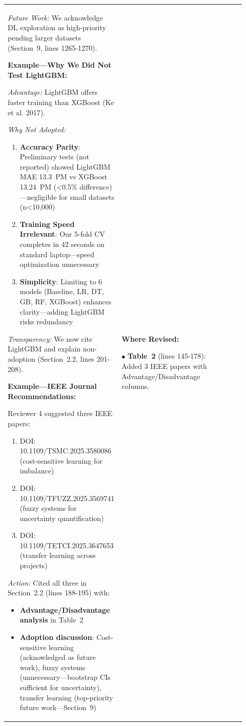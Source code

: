 \documentclass[11pt,a4paper]{article}
\begin{document}
\begin{longtable}{>{\raggedright\arraybackslash}p{0.26\linewidth}|>{\raggedright\arraybackslash}p{0.44\linewidth}|>{\raggedright\arraybackslash}p{0.22\linewidth}}
\textit{Future Work:} We acknowledge DL exploration as high-priority pending larger datasets (Section~9, lines 1265-1270).

\textbf{Example---Why We Did Not Test LightGBM:}

\textit{Advantage:} LightGBM offers faster training than XGBoost (Ke et al. 2017).

\textit{Why Not Adopted:}
\begin{enumerate}
    \item \textbf{Accuracy Parity}: Preliminary tests (not reported) showed LightGBM MAE 13.3~PM vs XGBoost 13.24~PM (<0.5\% difference)---negligible for small datasets (n<10,000)
    \item \textbf{Training Speed Irrelevant}: Our 5-fold CV completes in 42 seconds on standard laptop---speed optimization unnecessary
    \item \textbf{Simplicity}: Limiting to 6 models (Baseline, LR, DT, GB, RF, XGBoost) enhances clarity---adding LightGBM risks redundancy
\end{enumerate}

\textit{Transparency:} We now cite LightGBM and explain non-adoption (Section~2.2, lines 201-208).

\textbf{Example---IEEE Journal Recommendations:}

Reviewer 4 suggested three IEEE papers:
\begin{enumerate}
    \item DOI: 10.1109/TSMC.2025.3580086 (cost-sensitive learning for imbalance)
    \item DOI: 10.1109/TFUZZ.2025.3569741 (fuzzy systems for uncertainty quantification)
    \item DOI: 10.1109/TETCI.2025.3647653 (transfer learning across projects)
\end{enumerate}

\textit{Action:} Cited all three in Section~2.2 (lines 188-195) with:
\begin{itemize}
    \item \textbf{Advantage/Disadvantage analysis} in Table~2
    \item \textbf{Adoption discussion}: Cost-sensitive learning (acknowledged as future work), fuzzy systems (unnecessary---bootstrap CIs sufficient for uncertainty), transfer learning (top-priority future work—Section~9)
\end{itemize} &

\textbf{Where Revised:}

$\bullet$ \textbf{Table~2} (lines 145-178): Added 3 IEEE papers with Advantage/Disadvantage columns.


\end{longtable}
\end{document}

